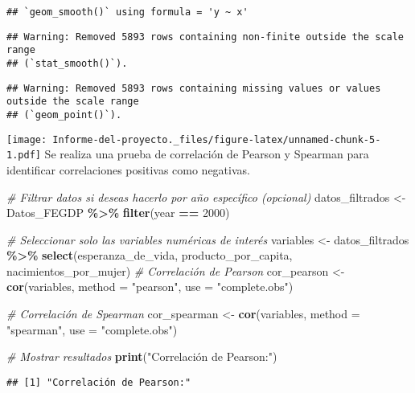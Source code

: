\documentclass[
]{article}
\newenvironment{Shaded}{\begin{snugshade}}{\end{snugshade}}
\newcommand{\AttributeTok}[1]{\textcolor[rgb]{0.13,0.29,0.53}{#1}}
\newcommand{\CommentTok}[1]{\textcolor[rgb]{0.56,0.35,0.01}{\textit{#1}}}
\newcommand{\DecValTok}[1]{\textcolor[rgb]{0.00,0.00,0.81}{#1}}
\newcommand{\FunctionTok}[1]{\textcolor[rgb]{0.13,0.29,0.53}{\textbf{#1}}}
\newcommand{\NormalTok}[1]{#1}
\newcommand{\OtherTok}[1]{\textcolor[rgb]{0.56,0.35,0.01}{#1}}
\newcommand{\SpecialCharTok}[1]{\textcolor[rgb]{0.81,0.36,0.00}{\textbf{#1}}}
\newcommand{\StringTok}[1]{\textcolor[rgb]{0.31,0.60,0.02}{#1}}
\begin{document}
\begin{verbatim}
## `geom_smooth()` using formula = 'y ~ x'
\end{verbatim}

\begin{verbatim}
## Warning: Removed 5893 rows containing non-finite outside the scale range
## (`stat_smooth()`).
\end{verbatim}

\begin{verbatim}
## Warning: Removed 5893 rows containing missing values or values outside the scale range
## (`geom_point()`).
\end{verbatim}

\texttt{[image: Informe-del-proyecto.\_files/figure-latex/unnamed-chunk-5-1.pdf]}
Se realiza una prueba de correlación de Pearson y Spearman para
identificar correlaciones positivas como negativas.

\begin{Shaded}
\begin{Highlighting}[]
\CommentTok{\# Filtrar datos si deseas hacerlo por año específico (opcional)}
\NormalTok{datos\_filtrados }\OtherTok{\textless{}{-}}\NormalTok{ Datos\_FEGDP }\SpecialCharTok{\%\textgreater{}\%} \FunctionTok{filter}\NormalTok{(year }\SpecialCharTok{==} \DecValTok{2000}\NormalTok{)}

\CommentTok{\# Seleccionar solo las variables numéricas de interés}
\NormalTok{variables }\OtherTok{\textless{}{-}}\NormalTok{ datos\_filtrados }\SpecialCharTok{\%\textgreater{}\%}
  \FunctionTok{select}\NormalTok{(esperanza\_de\_vida, producto\_por\_capita, nacimientos\_por\_mujer)}
\CommentTok{\# Correlación de Pearson}
\NormalTok{cor\_pearson }\OtherTok{\textless{}{-}} \FunctionTok{cor}\NormalTok{(variables, }\AttributeTok{method =} \StringTok{"pearson"}\NormalTok{, }\AttributeTok{use =} \StringTok{"complete.obs"}\NormalTok{)}

\CommentTok{\# Correlación de Spearman}
\NormalTok{cor\_spearman }\OtherTok{\textless{}{-}} \FunctionTok{cor}\NormalTok{(variables, }\AttributeTok{method =} \StringTok{"spearman"}\NormalTok{, }\AttributeTok{use =} \StringTok{"complete.obs"}\NormalTok{)}

\CommentTok{\# Mostrar resultados}
\FunctionTok{print}\NormalTok{(}\StringTok{"Correlación de Pearson:"}\NormalTok{)}
\end{Highlighting}
\end{Shaded}

\begin{verbatim}
## [1] "Correlación de Pearson:"
\end{verbatim}
\end{document}
